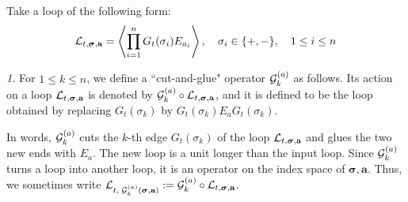\begin{definition}\label{Def:oper_loop}
Take a loop of the following form:
\begin{equation}\label{taahCal}
   {\cal L}_{t, \boldsymbol{\sigma}, \textbf{a}} = \left\langle \prod_{i=1}^n G_t(\sigma_i) E_{a_i} \right\rangle, \quad \sigma_i \in \{+, -\}, \quad 1 \le i \le n 
\end{equation}
 
 \noindent 
 \emph{1.} 
 For $1 \le k \le n$, we define a ``cut-and-glue" operator ${\cal G}^{(a)}_{k}$ as follows. Its action on a loop ${\cal L}_{t,\boldsymbol{\sigma},\textbf{a}}$ is denoted by ${\cal G}^{(a)}_{k} \circ {\cal L}_{t, \boldsymbol{\sigma}, \textbf{a}}$, and it is defined to be the loop obtained by replacing $G_t(\sigma_k)$ by $G_{t}(\sigma_k) E_a G_{t}(\sigma_k)$.
 
  In words, ${\cal G}^{(a)}_{k}$ cuts the $k$-th edge $G_t(\sigma_k)$ of the loop ${\cal L}_{t,\boldsymbol{\sigma},\textbf{a}}$ and glues the two new ends with $E_a$. The new loop is a unit longer than the input loop. Since ${\cal G}^{(a)}_{k}$ turns a loop into another loop, it is an operator on the index space of $\boldsymbol{\sigma},\textbf{a}$. Thus, we sometimes write ${\cal L}_{t, \;  {\cal G}^{(a)}_{k} (\boldsymbol{\sigma}, \textbf{a})}:={\cal G}^{(a)}_{k} \circ {\cal L}_{t, \boldsymbol{\sigma}, \textbf{a}}$.
    
   \begin{figure}[ht]
        \centering
\end{figure}
\end{definition}
